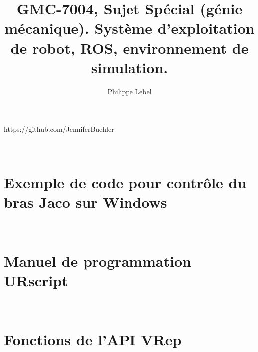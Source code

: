 \documentclass{articleUL}
\title{GMC-7004, Sujet Spécial (génie mécanique). Système d'exploitation de robot, ROS, environnement de simulation.}
\author{Philippe Lebel
 \affiliation{Université Laval, philippe.lebel.4@ulaval.ca}}
\begin{document}
 \maketitle
 
 \newpage
 
 
 
 
 
 \begin{thebibliography}{}
  https://github.com/JenniferBuehler
 \end{thebibliography}
 \newpage
 \appendix
 \section{\\Exemple de code pour contrôle du bras Jaco sur Windows} \label{app:jaco_windows}


\section{\\Manuel de programmation URscript} \label{app:URscript_manual}



\section{\\Fonctions de l'API VRep} \label{app:VRep_manual}


 
\end{document}
